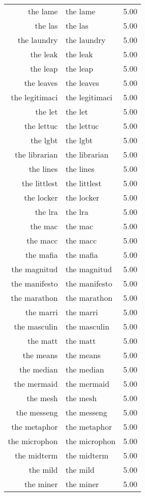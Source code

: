 \begin{table}[ht]
\begin{tabular}{rlr}
  the lame & the lame & 5.00 \\ 
  the las & the las & 5.00 \\ 
  the laundry & the laundry & 5.00 \\ 
  the leak & the leak & 5.00 \\ 
  the leap & the leap & 5.00 \\ 
  the leaves & the leaves & 5.00 \\ 
  the legitimaci & the legitimaci & 5.00 \\ 
  the let & the let & 5.00 \\ 
  the lettuc & the lettuc & 5.00 \\ 
  the lgbt & the lgbt & 5.00 \\ 
  the librarian & the librarian & 5.00 \\ 
  the lines & the lines & 5.00 \\ 
  the littlest & the littlest & 5.00 \\ 
  the locker & the locker & 5.00 \\ 
  the lra & the lra & 5.00 \\ 
  the mac & the mac & 5.00 \\ 
  the macc & the macc & 5.00 \\ 
  the mafia & the mafia & 5.00 \\ 
  the magnitud & the magnitud & 5.00 \\ 
  the manifesto & the manifesto & 5.00 \\ 
  the marathon & the marathon & 5.00 \\ 
  the marri & the marri & 5.00 \\ 
  the masculin & the masculin & 5.00 \\ 
  the matt & the matt & 5.00 \\ 
  the means & the means & 5.00 \\ 
  the median & the median & 5.00 \\ 
  the mermaid & the mermaid & 5.00 \\ 
  the mesh & the mesh & 5.00 \\ 
  the messeng & the messeng & 5.00 \\ 
  the metaphor & the metaphor & 5.00 \\ 
  the microphon & the microphon & 5.00 \\ 
  the midterm & the midterm & 5.00 \\ 
  the mild & the mild & 5.00 \\ 
  the miner & the miner & 5.00 \\ 

\end{tabular}
\end{table}
